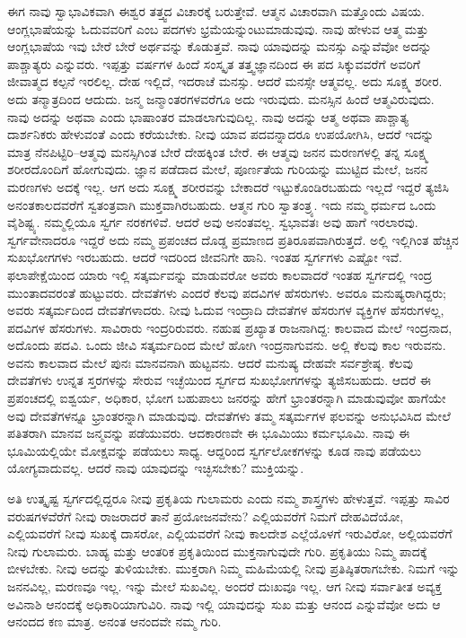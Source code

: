 ಈಗ ನಾವು ಸ್ವಾಭಾವಿಕವಾಗಿ ಈಶ್ವರ ತತ್ತ್ವದ ವಿಚಾರಕ್ಕೆ ಬರುತ್ತೇವೆ. ಆತ್ಮನ ವಿಚಾರವಾಗಿ ಮತ್ತೊಂದು ವಿಷಯ. ಆಂಗ್ಲಭಾಷೆಯನ್ನು ಓದುವವರಿಗೆ  ಎಂಬ ಪದಗಳು ಭ್ರಮೆಯನ್ನುಂಟುಮಾಡುವುವು. ನಾವು ಹೇಳುವ ಆತ್ಮ ಮತ್ತು ಆಂಗ್ಲಭಾಷೆಯ ಇವು ಬೇರೆ ಬೇರೆ ಅರ್ಥವನ್ನು ಕೊಡುತ್ತವೆ. ನಾವು ಯಾವುದನ್ನು ಮನಸ್ಸು  ಎನ್ನುವೆವೋ ಅದನ್ನು ಪಾಶ್ಚಾತ್ಯರು ಎನ್ನುವರು. ಇಪ್ಪತ್ತು ವರ್ಷಗಳ ಹಿಂದೆ ಸಂಸ್ಕೃತ ತತ್ತ್ವಜ್ಞಾನದಿಂದ ಈ ಪದ ಸಿಕ್ಕುವವರೆಗೆ ಅವರಿಗೆ ಜೀವಾತ್ಮದ ಕಲ್ಪನೆ ಇರಲಿಲ್ಲ. ದೇಹ ಇಲ್ಲಿದೆ, ಇದರಾಚೆ ಮನಸ್ಸು. ಆದರೆ ಮನಸ್ಸೇ ಆತ್ಮವಲ್ಲ. ಅದು ಸೂಕ್ಷ್ಮ ಶರೀರ. ಅದು ತನ್ಮಾತ್ರದಿಂದ ಆದುದು. ಜನ್ಮ ಜನ್ಮಾಂತರಗಳವರೆಗೂ ಅದು ಇರುವುದು. ಮನಸ್ಸಿನ ಹಿಂದೆ ಆತ್ಮವಿರುವುದು. ನಾವು ಅದನ್ನು ಅಥವಾ  ಎಂದು ಭಾಷಾಂತರ ಮಾಡಲಾಗುವುದಿಲ್ಲ. ನಾವು ಅದನ್ನು ಆತ್ಮ ಅಥವಾ ಪಾಶ್ಚಾತ್ಯ ದಾರ್ಶನಿಕರು ಹೇಳುವಂತೆ  ಎಂದು ಕರೆಯಬೇಕು. ನೀವು ಯಾವ ಪದವನ್ನಾದರೂ ಉಪಯೋಗಿಸಿ, ಆದರೆ ಇದನ್ನು ಮಾತ್ರ ನೆನಪಿಟ್ಟಿರಿ–ಆತ್ಮವು ಮನಸ್ಸಿಗಿಂತ ಬೇರೆ ದೇಹಕ್ಕಿಂತ ಬೇರೆ. ಈ ಆತ್ಮವು ಜನನ ಮರಣಗಳಲ್ಲಿ ತನ್ನ ಸೂಕ್ಷ್ಮ ಶರೀರದೊಂದಿಗೆ ಹೋಗುವುದು. ಜ್ಞಾನ ಪಡೆದಾದ ಮೇಲೆ, ಪೂರ್ಣತೆಯ ಗುರಿಯನ್ನು ಮುಟ್ಟಿದ ಮೇಲೆ, ಜನನ ಮರಣಗಳು ಅದಕ್ಕೆ ಇಲ್ಲ. ಆಗ ಅದು ಸೂಕ್ಷ್ಮ ಶರೀರವನ್ನು ಬೇಕಾದರೆ ಇಟ್ಟುಕೊಂಡಿರಬಹುದು ಇಲ್ಲದೆ ಇದ್ದರೆ ತ್ಯಜಿಸಿ ಅನಂತಕಾಲದವರೆಗೆ ಸ್ವತಂತ್ರವಾಗಿ ಮುಕ್ತವಾಗಿರಬಹುದು. ಆತ್ಮನ ಗುರಿ ಸ್ವಾತಂತ್ರ್ಯ. ಇದು ನಮ್ಮ ಧರ್ಮದ ಒಂದು ವೈಶಿಷ್ಟ್ಯ. ನಮ್ಮಲ್ಲಿಯೂ ಸ್ವರ್ಗ ನರಕಗಳಿವೆ. ಆದರೆ ಅವು ಅನಂತವಲ್ಲ. ಸ್ವಭಾವತಃ ಅವು ಹಾಗೆ ಇರಲಾರವು. ಸ್ವರ್ಗವೇನಾದರೂ ಇದ್ದರೆ ಅದು ನಮ್ಮ ಪ್ರಪಂಚದ ದೊಡ್ಡ ಪ್ರಮಾಣದ ಪ್ರತಿರೂಪವಾಗಿರುತ್ತದೆ. ಅಲ್ಲಿ ಇಲ್ಲಿಗಿಂತ ಹೆಚ್ಚಿನ ಸುಖಭೋಗಗಳು ಇರಬಹುದು. ಆದರೆ ಇದರಿಂದ ಜೀವನಿಗೇ ಹಾನಿ. ಇಂತಹ ಸ್ವರ್ಗಗಳು ಎಷ್ಟೋ ಇವೆ. ಫಲಾಪೇಕ್ಷೆಯಿಂದ ಯಾರು ಇಲ್ಲಿ ಸತ್ಕರ್ಮವನ್ನು ಮಾಡುವರೋ ಅವರು ಕಾಲವಾದರೆ ಇಂತಹ ಸ್ವರ್ಗದಲ್ಲಿ ಇಂದ್ರ ಮುಂತಾದವರಂತೆ ಹುಟ್ಟುವರು. ದೇವತೆಗಳು ಎಂದರೆ ಕೆಲವು ಪದವಿಗಳ ಹೆಸರುಗಳು. ಅವರೂ ಮನುಷ್ಯರಾಗಿದ್ದರು; ಅವರು ಸತ್ಕರ್ಮದಿಂದ ದೇವತೆಗಳಾದರು. ನೀವು ಓದುವ ಇಂದ್ರಾದಿ ದೇವತೆಗಳ ಹೆಸರುಗಳ ವ್ಯಕ್ತಿಗಳ ಹೆಸರುಗಳಲ್ಲ, ಪದವಿಗಳ ಹೆಸರುಗಳು. ಸಾವಿರಾರು ಇಂದ್ರರಿರುವರು. ನಹುಷ ಪ್ರಖ್ಯಾತ ರಾಜನಾಗಿದ್ದ: ಕಾಲವಾದ ಮೇಲೆ ಇಂದ್ರನಾದ, ಅದೊಂದು ಪದವಿ. ಒಂದು ಜೀವಿ ಸತ್ಕರ್ಮದಿಂದ ಮೇಲೆ ಹೋಗಿ ಇಂದ್ರನಾಗುವನು. ಅಲ್ಲಿ ಕೆಲವು ಕಾಲ ಇರುವನು. ಅವನು ಕಾಲವಾದ ಮೇಲೆ ಪುನಃ ಮಾನವನಾಗಿ ಹುಟ್ಟವನು. ಆದರೆ ಮನುಷ್ಯ ದೇಹವೇ ಸರ್ವಶ್ರೇಷ್ಠ. ಕೆಲವು ದೇವತೆಗಳು ಉನ್ನತ ಸ್ತರಗಳನ್ನು ಸೇರುವ ಇಚ್ಛೆಯಿಂದ ಸ್ವರ್ಗದ ಸುಖಭೋಗಗಳನ್ನು ತ್ಯಜಿಸಬಹುದು. ಆದರೆ ಈ ಪ್ರಪಂಚದಲ್ಲಿ ಐಶ್ವರ್ಯ, ಅಧಿಕಾರ, ಭೋಗ ಬಹುಪಾಲು ಜನರನ್ನು ಹೇಗೆ ಭ್ರಾಂತರನ್ನಾಗಿ ಮಾಡುವುವೋ ಹಾಗೆಯೇ ಅವು ದೇವತೆಗಳನ್ನೂ ಭ್ರಾಂತರನ್ನಾಗಿ ಮಾಡುವುವು. ದೇವತೆಗಳು ತಮ್ಮ ಸತ್ಕರ್ಮಗಳ ಫಲವನ್ನು ಅನುಭವಿಸಿದ ಮೇಲೆ ಪತಿತರಾಗಿ ಮಾನವ ಜನ್ಮವನ್ನು ಪಡೆಯುವರು. ಆದಕಾರಣವೇ ಈ ಭೂಮಿಯು ಕರ್ಮಭೂಮಿ. ನಾವು ಈ ಭೂಮಿಯಲ್ಲಿಯೇ ಮೋಕ್ಷವನ್ನು ಪಡೆಯಲು ಸಾಧ್ಯ. ಆದ್ದರಿಂದ ಸ್ವರ್ಗಲೋಕಗಳನ್ನು ಕೂಡ ನಾವು ಪಡೆಯಲು ಯೋಗ್ಯವಾದುವಲ್ಲ. ಆದರೆ ನಾವು ಯಾವುದನ್ನು ಇಚ್ಛಿಸಬೇಕು? ಮುಕ್ತಿಯನ್ನು. 

ಅತಿ ಉತ್ಕೃಷ್ಟ ಸ್ವರ್ಗದಲ್ಲಿದ್ದರೂ ನೀವು ಪ್ರಕೃತಿಯ ಗುಲಾಮರು ಎಂದು ನಮ್ಮ ಶಾಸ್ತ್ರಗಳು ಹೇಳುತ್ತವೆ. ಇಪ್ಪತ್ತು ಸಾವಿರ ವರುಷಗಳವೆರೆಗೆ ನೀವು ರಾಜರಾದರೆ ತಾನೆ ಪ್ರಯೋಜನವೇನು? ಎಲ್ಲಿಯವರೆಗೆ ನಿಮಗೆ ದೇಹವಿದೆಯೋ, ಎಲ್ಲಿಯವರೆಗೆ ನೀವು ಸುಖಕ್ಕೆ ದಾಸರೋ, ಎಲ್ಲಿಯವರೆಗೆ ನೀವು ಕಾಲದೇಶ ಎಲ್ಲೆಯೊಳಗೆ ಇರುವಿರೋ, ಅಲ್ಲಿಯವರೆಗೆ ನೀವು ಗುಲಾಮರು. ಬಾಹ್ಯ ಮತ್ತು ಆಂತರಿಕ ಪ್ರಕೃತಿಯಿಂದ ಮುಕ್ತನಾಗುವುದೇ ಗುರಿ. ಪ್ರಕೃತಿಯು ನಿಮ್ಮ ಪಾದಕ್ಕೆ ಬೀಳಬೇಕು. ನೀವು ಅದನ್ನು ತುಳಿಯಬೇಕು. ಮುಕ್ತರಾಗಿ ನಿಮ್ಮ ಮಹಿಮೆಯಲ್ಲಿ ನೀವು ಪ್ರತಿಷ್ಠಿತರಾಗಬೇಕು. ನಿಮಗೆ ಇನ್ನು ಜನನವಿಲ್ಲ, ಮರಣವೂ ಇಲ್ಲ. ಇನ್ನು ಮೇಲೆ ಸುಖವಿಲ್ಲ. ಅಂದರೆ ದುಃಖವೂ ಇಲ್ಲ. ಆಗ ನೀವು ಸರ್ವಾತೀತ ಅವ್ಯಕ್ತ ಅವಿನಾಶಿ ಆನಂದಕ್ಕೆ ಅಧಿಕಾರಿಯಾಗುವಿರಿ. ನಾವು ಇಲ್ಲಿ ಯಾವುದನ್ನು ಸುಖ ಮತ್ತು ಆನಂದ ಎನ್ನುವೆವೋ ಅದು ಆ ಆನಂದದ ಕಣ ಮಾತ್ರ. ಅನಂತ ಆನಂದವೇ ನಮ್ಮ ಗುರಿ. 

